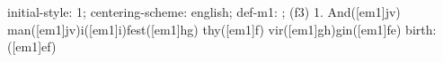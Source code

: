 initial-style: 1;
centering-scheme: english;
def-m1: \grealign;
(f3) 1. And([em1]jv) man([em1]jv)i([em1]i)fest([em1]hg) thy([em1]f) vir([em1]gh)gin([em1]fe) birth:([em1]ef)